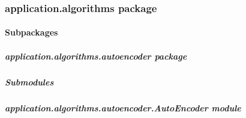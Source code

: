 \documentclass[letterpaper,10pt,english]{sphinxmanual}
\begin{document}
\subsubsection{application.algorithms package}
\label{\detokenize{application.algorithms:application-algorithms-package}}\label{\detokenize{application.algorithms::doc}}

\paragraph{Subpackages}
\label{\detokenize{application.algorithms:subpackages}}
\sphinxstepscope


\subparagraph{application.algorithms.autoencoder package}
\label{\detokenize{application.algorithms.autoencoder:application-algorithms-autoencoder-package}}\label{\detokenize{application.algorithms.autoencoder::doc}}

\subparagraph{Submodules}
\label{\detokenize{application.algorithms.autoencoder:submodules}}

\subparagraph{application.algorithms.autoencoder.AutoEncoder module}
\label{\detokenize{application.algorithms.autoencoder:module-application.algorithms.autoencoder.AutoEncoder}}\label{\detokenize{application.algorithms.autoencoder:application-algorithms-autoencoder-autoencoder-module}}
\end{document}
